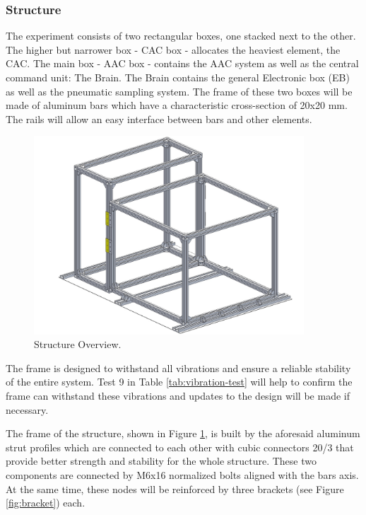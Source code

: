 \subsubsection{Structure}
\label{sec:4.4.1}

The experiment consists of two rectangular boxes, one stacked next to the other. The higher but narrower box - CAC box - allocates the heaviest element, the CAC. The main box - AAC box - contains the AAC system as well as the central command unit: The Brain. The Brain contains the general Electronic box (EB) as well as the pneumatic sampling system. The frame of these two boxes will be made of aluminum bars which have a characteristic cross-section of 20x20 mm. The rails will allow an easy interface between bars and other elements.


 \begin{figure}[H]
     \centering
     \includegraphics[width=0.9\textwidth]{4-experiment-design/img/Mechanical/structure_pic.jpg}
     \caption{Structure Overview.}
     \label{structure}
\end{figure}

The frame is designed to withstand all vibrations and ensure a reliable stability of the entire system. Test 9 in Table \ref{tab:vibration-test} will help to confirm the frame can withstand these vibrations and updates to the design will be made if necessary. 

The frame of the structure, shown in Figure \ref{structure}, is built by the aforesaid aluminum strut profiles which are connected to each other with cubic connectors 20/3 that provide better strength and stability for the whole structure. These two components are connected by M6x16 normalized bolts aligned with the bars axis. At the same time, these nodes will be reinforced by three brackets (see Figure \ref{fig:bracket}) each.

